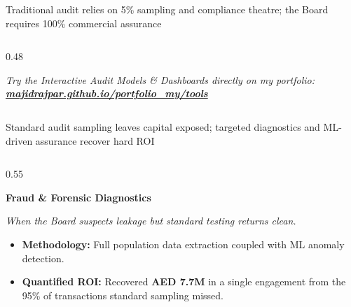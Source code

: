 \documentclass[aspectratio=169, 8pt]{beamer}
\begin{document}
\begin{frame}{Traditional audit relies on 5\% sampling and compliance theatre; the Board requires 100\% commercial assurance}
\begin{columns}[T]
\begin{column}{0.48\textwidth}
            \vspace{0.4cm}
            \begin{center}
                \textit{\footnotesize \color{bcgDarkGray} Try the Interactive Audit Models \& Dashboards directly on my portfolio:\\ \href{https://majidrajpar.github.io/portfolio_my/tools}{\textbf{\color{bcgGreen} majidrajpar.github.io/portfolio\_my/tools}}}
            \end{center}
        \end{column}
    \end{columns}
\end{frame}

\begin{frame}{Standard audit sampling leaves capital exposed; targeted diagnostics and ML-driven assurance recover hard ROI}
    \begin{columns}[T]
        \begin{column}{0.55\textwidth}
            \begin{tcolorbox}[colback=bcgLightGray, colframe=bcgLightGray, arc=0pt, left=2pt, top=1pt, bottom=1pt]
                \textbf{\small \color{bcgGreen} Fraud \& Forensic Diagnostics}
            \end{tcolorbox}
            \textit{\scriptsize \color{gray} When the Board suspects leakage but standard testing returns clean.}
            \begin{itemize}
                \setlength{\itemsep}{1pt}
                \setlength{\parskip}{0pt}
                \item \textbf{Methodology:} Full population data extraction coupled with ML anomaly detection.
                \item \textbf{\color{bcgGreen} Quantified ROI:} Recovered \textbf{AED 7.7M} in a single engagement from the 95\% of transactions standard sampling missed.
            \end{itemize}
            

\end{column}
\end{columns}
\end{frame}
\end{document}
